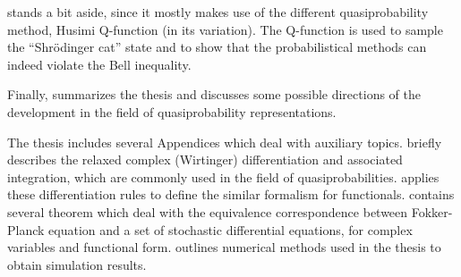  stands a bit aside, since it mostly makes use of the different quasiprobability method, Husimi Q-function (in its  variation).
The Q-function is used to sample the ``Shr\"{o}dinger cat'' state and to show that the probabilistical methods can indeed violate the Bell inequality.

Finally,  summarizes the thesis and discusses some possible directions of the development in the field of quasiprobability representations.

The thesis includes several Appendices which deal with auxiliary topics.
 briefly describes the relaxed complex (Wirtinger) differentiation and associated integration, which are commonly used in the field of quasiprobabilities.
 applies these differentiation rules to define the similar formalism for functionals.
 contains several theorem which deal with the equivalence correspondence between Fokker-Planck equation and a set of stochastic differential equations, for complex variables and functional form.
 outlines numerical methods used in the thesis to obtain simulation results.
